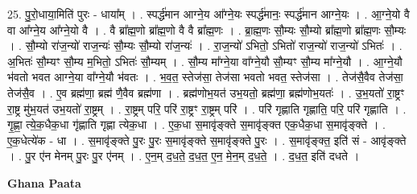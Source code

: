 \documentclass[17pt]{extarticle}
\begin{document}
25. पु॒रो॒धाया॒मिति॑ पुरः - धाया᳚म् । . स्पर्द्ध॑मान आग्ने॒य आ᳚ग्ने॒यः स्पर्द्ध॑मानः॒ स्पर्द्ध॑मान आग्ने॒यः । . आ॒ग्ने॒यो वै वा आ᳚ग्ने॒य आ᳚ग्ने॒यो वै । . वै ब्रा᳚ह्म॒णो ब्रा᳚ह्म॒णो वै वै ब्रा᳚ह्म॒णः । . ब्रा॒ह्म॒णः सौ॒म्यः सौ॒म्यो ब्रा᳚ह्म॒णो ब्रा᳚ह्म॒णः सौ॒म्यः । . सौ॒म्यो रा॑ज॒न्यो॑ राज॒न्यः॑ सौ॒म्यः सौ॒म्यो रा॑ज॒न्यः॑ । . रा॒ज॒न्यो॑ ऽभितो॒ ऽभितो॑ राज॒न्यो॑ राज॒न्यो॑ ऽभितः॑ । . अ॒भितः॑ सौ॒म्यꣳ सौ॒म्य म॒भितो॒ ऽभितः॑ सौ॒म्यम् । . सौ॒म्य मा᳚ग्ने॒या वा᳚ग्ने॒यौ सौ॒म्यꣳ सौ॒म्य मा᳚ग्ने॒यौ । . आ॒ग्ने॒यौ भ॑वतो भवत आग्ने॒या वा᳚ग्ने॒यौ भ॑वतः । . भ॒व॒त॒ स्तेज॑सा॒ तेज॑सा भवतो भवत॒ स्तेज॑सा । . तेज॑सै॒वैव तेज॑सा॒ तेज॑सै॒व । . ए॒व ब्रह्म॑णा॒ ब्रह्म॑ णै॒वैव ब्रह्म॑णा । . ब्रह्म॑णोभ॒यत॑ उभ॒यतो॒ ब्रह्म॑णा॒ ब्रह्म॑णोभ॒यतः॑ । . उ॒भ॒यतो॑ रा॒ष्ट्रꣳ रा॒ष्ट्र मु॑भ॒यत॑ उभ॒यतो॑ रा॒ष्ट्रम् । . रा॒ष्ट्रम् परि॒ परि॑ रा॒ष्ट्रꣳ रा॒ष्ट्रम् परि॑ । . परि॑ गृह्णाति गृह्णाति॒ परि॒ परि॑ गृह्णाति । . गृ॒ह्णा॒ त्ये॒क॒धैक॒धा गृ॑ह्णाति गृह्णा त्येक॒धा । . ए॒क॒धा स॒मावृ॑ङ्क्ते स॒मावृ॑ङ्क्त एक॒धैक॒धा स॒मावृ॑ङ्क्ते । . ए॒क॒धेत्ये॑क - धा । . स॒मावृ॑ङ्क्ते पु॒रः पु॒रः स॒मावृ॑ङ्क्ते स॒मावृ॑ङ्क्ते पु॒रः । . स॒मावृ॑ङ्क्त॒ इति॑ सं - आवृ॑ङ्क्ते । . पु॒र ए॑न मेनम् पु॒रः पु॒र ए॑नम् । . ए॒न॒म् द॒ध॒ते॒ द॒ध॒त॒ ए॒न॒ मे॒न॒म् द॒ध॒ते॒ । . द॒ध॒त॒ इति॑ दधते । \newline

\textbf{Ghana Paata } \newline
\end{document}

